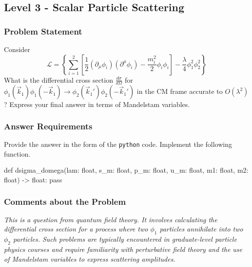 \clearpage




\subsection{Level 3 - Scalar Particle Scattering}


\subsubsection*{Problem Statement}
Consider
\begin{equation}
\mathcal{L} = \left\{ \sum_{i=1}^2 \left[ \frac{1}{2} (\partial_\mu \phi_i)(\partial^\mu \phi_i) - \frac{m_i^2}{2} \phi_i \phi_i \right] - \frac{\lambda}{4} \phi_1^2 \phi_2^2 \right\}
\end{equation}
What is the differential cross section \( \frac{d\sigma}{d\Omega} \) for \( \phi_1 (\vec{k}_1) \phi_1 (-\vec{k}_1) \to \phi_2 (\vec{k}_1') \phi_2 (-\vec{k}_1') \) in the CM frame accurate to \( O(\lambda^2) \)? Express your final answer in terms of Mandelstam variables. 

\subsubsection*{Answer Requirements}
Provide the answer in the form of the \texttt{python} code. Implement the following function.
\begin{python}
def dsigma_domega(lam: float, s_m: float, p_m: float, u_m: float, 
                  m1: float, m2: float) -> float:
    pass
\end{python}


\subsubsection*{Comments about the Problem}
\textit{This is a question from quantum field theory. It involves calculating the differential cross section for a process where two \(\phi_1\) particles annihilate into two \(\phi_2\) particles. Such problems are typically encountered in graduate-level particle physics courses and require familiarity with perturbative field theory and the use of Mandelstam variables to express scattering amplitudes.}

